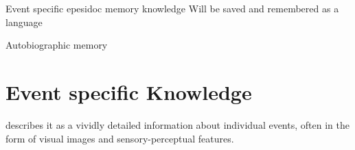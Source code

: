 \begin{frame}[allowframebreaks]{Event specific epesidoc memory knowledge}
    Will be saved and remembered as a language
    
    Autobiographic memory
    
    
    \section{Event specific Knowledge}
        \cite{pillemer-2001-momentous-events-and-the-life-story} describes it as a vividly detailed information about individual events, often in the form of visual images and sensory-perceptual features.

\end{frame}